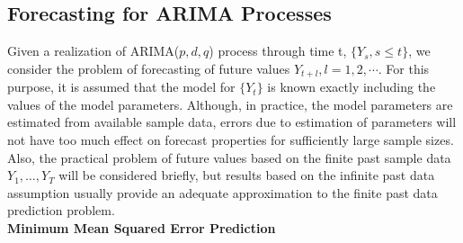 \subsection{Forecasting for ARIMA Processes} \hfill


Given a realization of ARIMA($p,d,q$) process through time t, $\{Y_s, s\leq t\}$, we consider the problem of forecasting of future values $Y_{t+l}, l = 1,2,\cdots$. For this purpose, it is assumed that the model for $\{Y_t\}$ is known exactly including the values of the model parameters. Although, in practice, the model parameters are estimated from available sample data, errors due to estimation of parameters will not have too much effect on forecast properties for sufficiently large sample sizes. Also, the practical problem of future values based on the finite past sample data $Y_1,\ldots,Y_T$ will be considered briefly, but results based on the infinite past data assumption usually provide an adequate approximation to the finite past data prediction problem. \\


\noindent \textbf{Minimum Mean Squared Error Prediction} \\


